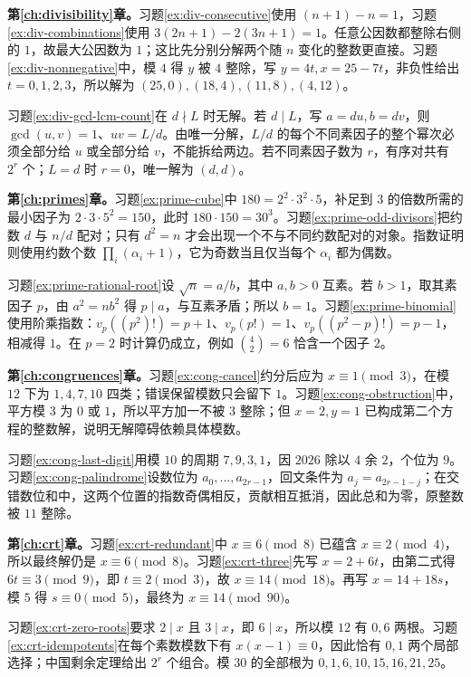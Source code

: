 \textbf{第\ref{ch:divisibility}章。}习题\ref{ex:div-consecutive}使用 $(n+1)-n=1$，习题\ref{ex:div-combinations}使用 $3(2n+1)-2(3n+1)=1$。任意公因数都整除右侧的 $1$，故最大公因数为 $1$；这比先分别分解两个随 $n$ 变化的整数更直接。习题\ref{ex:div-nonnegative}中，模 $4$ 得 $y$ 被 $4$ 整除，写 $y=4t,x=25-7t$，非负性给出 $t=0,1,2,3$，所以解为 $(25,0),(18,4),(11,8),(4,12)$。

习题\ref{ex:div-gcd-lcm-count}在 $d\nmid L$ 时无解。若 $d\mid L$，写 $a=du,b=dv$，则 $\gcd(u,v)=1$、$uv=L/d$。由唯一分解，$L/d$ 的每个不同素因子的整个幂次必须全部分给 $u$ 或全部分给 $v$，不能拆给两边。若不同素因子数为 $r$，有序对共有 $2^r$ 个；$L=d$ 时 $r=0$，唯一解为 $(d,d)$。

\textbf{第\ref{ch:primes}章。}习题\ref{ex:prime-cube}中 $180=2^2\cdot3^2\cdot5$，补足到 $3$ 的倍数所需的最小因子为 $2\cdot3\cdot5^2=150$，此时 $180\cdot150=30^3$。习题\ref{ex:prime-odd-divisors}把约数 $d$ 与 $n/d$ 配对；只有 $d^2=n$ 才会出现一个不与不同约数配对的对象。指数证明则使用约数个数 $\prod_i(\alpha_i+1)$，它为奇数当且仅当每个 $\alpha_i$ 都为偶数。

习题\ref{ex:prime-rational-root}设 $\sqrt n=a/b$，其中 $a,b>0$ 互素。若 $b>1$，取其素因子 $p$，由 $a^2=nb^2$ 得 $p\mid a$，与互素矛盾；所以 $b=1$。习题\ref{ex:prime-binomial}使用阶乘指数：$v_p((p^2)!)=p+1$、$v_p(p!)=1$、$v_p((p^2-p)!)=p-1$，相减得 $1$。在 $p=2$ 时计算仍成立，例如 $\binom42=6$ 恰含一个因子 $2$。

\textbf{第\ref{ch:congruences}章。}习题\ref{ex:cong-cancel}约分后应为 $x\equiv1\pmod3$，在模 $12$ 下为 $1,4,7,10$ 四类；错误保留模数只会留下 $1$。习题\ref{ex:cong-obstruction}中，平方模 $3$ 为 $0$ 或 $1$，所以平方加一不被 $3$ 整除；但 $x=2,y=1$ 已构成第二个方程的整数解，说明无解障碍依赖具体模数。

习题\ref{ex:cong-last-digit}用模 $10$ 的周期 $7,9,3,1$，因 $2026$ 除以 $4$ 余 $2$，个位为 $9$。习题\ref{ex:cong-palindrome}设数位为 $a_0,\ldots,a_{2r-1}$，回文条件为 $a_j=a_{2r-1-j}$；在交错数位和中，这两个位置的指数奇偶相反，贡献相互抵消，因此总和为零，原整数被 $11$ 整除。

\textbf{第\ref{ch:crt}章。}习题\ref{ex:crt-redundant}中 $x\equiv6\pmod8$ 已蕴含 $x\equiv2\pmod4$，所以最终解仍是 $x\equiv6\pmod8$。习题\ref{ex:crt-three}先写 $x=2+6t$，由第二式得 $6t\equiv3\pmod9$，即 $t\equiv2\pmod3$，故 $x\equiv14\pmod{18}$。再写 $x=14+18s$，模 $5$ 得 $s\equiv0\pmod5$，最终为 $x\equiv14\pmod{90}$。

习题\ref{ex:crt-zero-roots}要求 $2\mid x$ 且 $3\mid x$，即 $6\mid x$，所以模 $12$ 有 $0,6$ 两根。习题\ref{ex:crt-idempotents}在每个素数模数下有 $x(x-1)\equiv0$，因此恰有 $0,1$ 两个局部选择；中国剩余定理给出 $2^r$ 个组合。模 $30$ 的全部根为 $0,1,6,10,15,16,21,25$。

